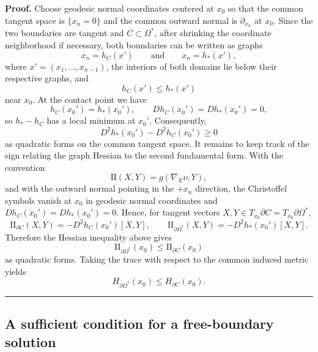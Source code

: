 \documentclass{article}
\newenvironment{proof}[1][Proof]{\textbf{#1.} }{\hfill\rule{0.5em}{0.5em}}
\begin{document}
\begin{proof}
Choose geodesic normal coordinates centered at $x_0$ so that the common
tangent space is $\{x_n=0\}$ and the common outward normal is
$\partial_{x_n}$ at $x_0$. Since the two boundaries are tangent and
$C\subset\Omega^*$, after shrinking the coordinate neighborhood if
necessary, both boundaries can be written as graphs
\[
x_n=h_C(x')\qquad\text{and}\qquad x_n=h_*(x'),
\]
where $x'=(x_1,\ldots,x_{n-1})$, the interiors of both domains lie below
their respective graphs, and
\[
h_C(x')\le h_*(x')
\]
near $x_0$. At the contact point we have
\[
h_C(x_0')=h_*(x_0'),
\qquad
Dh_C(x_0')=Dh_*(x_0')=0,
\]
so $h_*-h_C$ has a local minimum at $x_0'$. Consequently,
\[
D^2h_*(x_0')-D^2h_C(x_0')\ge0
\]
as quadratic forms on the common tangent space.
It remains to keep track of the sign relating the graph Hessian to the
second fundamental form. With the convention
\[
\mathrm{II}(X,Y)=g(\nabla_X\nu,Y),
\]
and with the outward normal pointing in the $+x_n$ direction, the
Christoffel symbols vanish at $x_0$ in geodesic normal coordinates and
$Dh_C(x_0')=Dh_*(x_0')=0$. Hence, for tangent vectors
$X,Y\in T_{x_0}\partial C=T_{x_0}\partial\Omega^*$,
\[
\mathrm{II}_{\partial C}(X,Y)=-D^2h_C(x_0')[X,Y],
\qquad
\mathrm{II}_{\partial\Omega^*}(X,Y)=-D^2h_*(x_0')[X,Y].
\]
Therefore the Hessian inequality above gives
\[
\mathrm{II}_{\partial\Omega^*}(x_0)
\le
\mathrm{II}_{\partial C}(x_0)
\]
as quadratic forms. Taking the trace with respect to the common induced
metric yields
\[
H_{\partial\Omega^*}(x_0)
\le
H_{\partial C}(x_0).
\]
\end{proof}

\subsection{A sufficient condition for a free-boundary solution}
\end{document}

